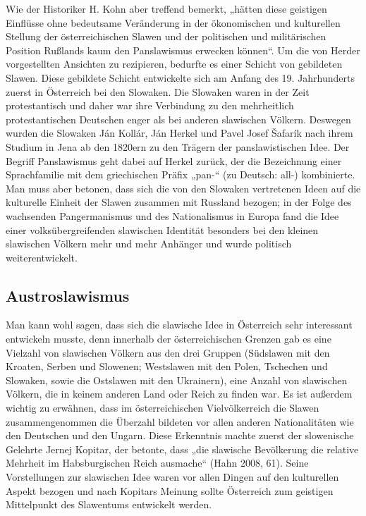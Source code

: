 \documentclass{../../sem_paper}
\begin{document}
Wie der Historiker H. Kohn\autocite[9]{kohn} aber treffend bemerkt, „hätten diese geistigen Einflüsse
ohne bedeutsame Veränderung in der ökonomischen und kulturellen Stellung der
österreichischen Slawen und der politischen und militärischen Position Rußlands kaum den
Panslawismus erwecken können“. Um die von Herder vorgestellten Ansichten zu rezipieren,
bedurfte es einer Schicht von gebildeten Slawen. Diese gebildete Schicht entwickelte sich am
Anfang des 19. Jahrhunderts zuerst in Österreich bei den Slowaken. Die Slowaken waren in
der Zeit protestantisch und daher war ihre Verbindung zu den mehrheitlich protestantischen
Deutschen enger als bei anderen slawischen Völkern. Deswegen wurden die Slowaken Ján
Kollár, Ján Herkel und Pavel Josef Šafarík nach ihrem Studium in Jena ab den 1820ern zu den
Trägern der panslawistischen Idee.\autocite[1]{orton} Der Begriff Panslawismus geht dabei auf
Herkel zurück, der die Bezeichnung einer Sprachfamilie mit dem griechischen Präfix „pan-“
(zu Deutsch: all-) kombinierte. Man muss aber betonen, dass sich die von den Slowaken
vertretenen Ideen auf die kulturelle Einheit der Slawen zusammen mit Russland bezogen; in
der Folge des wachsenden Pangermanismus und des Nationalismus in Europa fand die Idee
einer volksübergreifenden slawischen Identität besonders bei den kleinen slawischen Völkern
mehr und mehr Anhänger und wurde politisch weiterentwickelt.

\subsection{Austroslawismus}
Man kann wohl sagen, dass sich die slawische Idee in Österreich sehr interessant entwickeln
musste, denn innerhalb der österreichischen Grenzen gab es eine Vielzahl von slawischen
Völkern aus den drei Gruppen (Südslawen mit den Kroaten, Serben und Slowenen;
Westslawen mit den Polen, Tschechen und Slowaken, sowie die Ostslawen mit den
Ukrainern), eine Anzahl von slawischen Völkern, die in keinem anderen Land oder Reich zu
finden war. Es ist außerdem wichtig zu erwähnen, dass im österreichischen Vielvölkerreich
die Slawen zusammengenommen die Überzahl bildeten vor allen anderen Nationalitäten wie
den Deutschen und den Ungarn. Diese Erkenntnis machte zuerst der slowenische Gelehrte
Jernej Kopitar, der betonte, dass „die slawische Bevölkerung die relative Mehrheit im
Habsburgischen Reich ausmache“\autocite[61]{hahn} (Hahn 2008, 61). Seine Vorstellungen zur slawischen Idee
waren vor allen Dingen auf den kulturellen Aspekt bezogen und nach Kopitars Meinung sollte
Österreich zum geistigen Mittelpunkt des Slawentums entwickelt werden.
\end{document}
